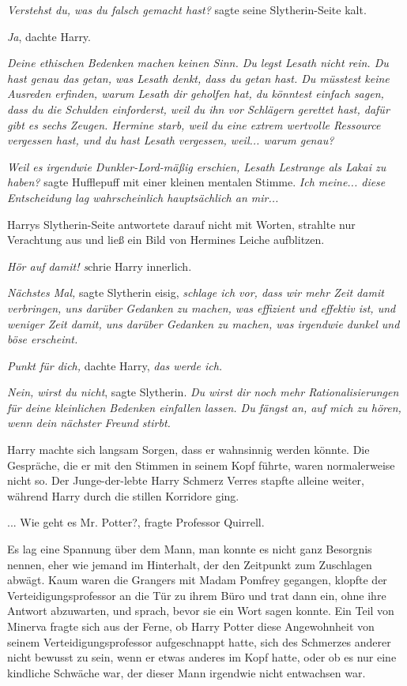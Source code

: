 \emph{Verstehst du, was du falsch gemacht hast?} sagte seine Slytherin-Seite
kalt.

\emph{Ja}, dachte Harry.

\emph{Deine ethischen Bedenken machen keinen Sinn. Du legst Lesath nicht rein.
Du hast genau das getan, was Lesath denkt, dass du getan hast. Du müsstest keine
Ausreden erfinden, warum Lesath dir geholfen hat, du könntest einfach sagen,
dass du die Schulden einforderst, weil du ihn vor Schlägern gerettet hast, dafür
gibt es sechs Zeugen. Hermine starb, weil du eine extrem wertvolle Ressource
vergessen hast, und du hast Lesath vergessen, weil... warum genau?}

\emph{Weil es irgendwie Dunkler-Lord-mäßig erschien, Lesath Lestrange als Lakai
zu haben?} sagte Hufflepuff mit einer kleinen mentalen Stimme.\emph{ Ich
meine... diese Entscheidung lag wahrscheinlich hauptsächlich an mir...}

Harrys Slytherin-Seite antwortete darauf nicht mit Worten, strahlte nur
Verachtung aus und ließ ein Bild von Hermines Leiche aufblitzen.

\emph{Hör auf damit! s}chrie Harry innerlich.

\emph{Nächstes Mal,} sagte Slytherin eisig, \emph{schlage ich vor, dass wir mehr
Zeit damit verbringen, uns darüber Gedanken zu machen, was effizient und
effektiv ist, und weniger Zeit damit, uns darüber Gedanken zu machen, was
irgendwie dunkel und böse erscheint.}

\emph{Punkt für dich,} dachte Harry, \emph{das werde ich.}

\emph{Nein, wirst du nicht}, sagte Slytherin. \emph{Du wirst dir noch mehr
Rationalisierungen für deine kleinlichen Bedenken einfallen lassen. Du fängst
an, auf mich zu hören, wenn dein nächster Freund stirbt.}

Harry machte sich langsam Sorgen, dass er wahnsinnig werden könnte. Die
Gespräche, die er mit den Stimmen in seinem Kopf führte, waren normalerweise
nicht so. Der Junge-der-lebte Harry Schmerz Verres stapfte alleine weiter,
während Harry durch die stillen Korridore ging.

... \glqq Wie geht es Mr. Potter?\grqq{}, fragte Professor Quirrell.

Es lag eine Spannung über dem Mann, man konnte es nicht ganz Besorgnis nennen,
eher wie jemand im Hinterhalt, der den Zeitpunkt zum Zuschlagen abwägt. Kaum
waren die Grangers mit Madam Pomfrey gegangen, klopfte der
Verteidigungsprofessor an die Tür zu ihrem Büro und trat dann ein, ohne ihre
Antwort abzuwarten, und sprach, bevor sie ein Wort sagen konnte. Ein Teil von
Minerva fragte sich aus der Ferne, ob Harry Potter diese Angewohnheit von seinem
Verteidigungsprofessor aufgeschnappt hatte, sich des Schmerzes anderer nicht
bewusst zu sein, wenn er etwas anderes im Kopf hatte, oder ob es nur eine
kindliche Schwäche war, der dieser Mann irgendwie nicht entwachsen war.

